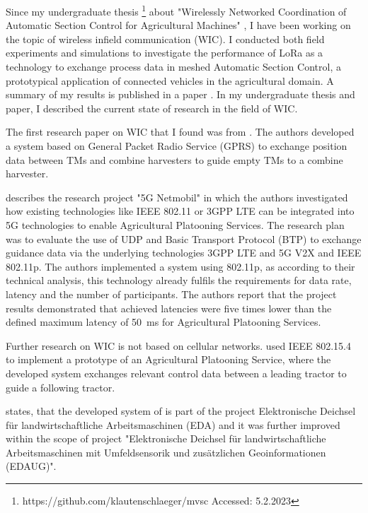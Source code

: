 Since my undergraduate thesis \footnote{https://github.com/klautenschlaeger/mvsc Accessed: 5.2.2023} about "Wirelessly Networked Coordination of Automatic Section Control for Agricultural Machines"
, I have been working on the topic of wireless infield communication (WIC). I conducted both field experiments and
simulations to investigate the performance of LoRa as a technology to exchange process data in
meshed Automatic Section Control, a prototypical application of connected vehicles in the agricultural domain.
A summary of my results is published in a paper \cite{lautenschlaeger_beyond_2022}.
In my undergraduate thesis and paper, I described the current state of research in the field of WIC.

The first research paper on WIC that I found was from \textcite{ali_multi-agent_2010}. The authors
developed a system based on General Packet Radio Service (GPRS) to exchange position data between \ac{TM}s and combine
harvesters to guide empty \ac{TM}s to a combine harvester.

\textcite{smolnik_5g_2020} describes the research project "5G Netmobil" in which the authors investigated how existing technologies like
IEEE 802.11 or 3GPP LTE can be integrated into 5G technologies to enable Agricultural Platooning Services. The research plan was to evaluate the use of \ac{UDP} and Basic Transport Protocol (BTP) to exchange guidance data via
the underlying technologies 3GPP LTE and 5G V2X and IEEE 802.11p. The authors implemented a system using 802.11p,
as according to their technical analysis, this technology already fulfils the requirements for data rate, latency
and the number of participants. The authors report that the project results demonstrated that achieved
latencies were five times lower than the defined maximum latency of \SI{50}{\milli\second} for Agricultural Platooning Services.

Further research on \ac{WIC} is not based on cellular networks. \cite{zhang_method_2009} used IEEE 802.15.4 to implement a
prototype of an Agricultural Platooning Service, where the developed system exchanges relevant control data between a leading tractor
to guide a following tractor.

\textcite{smolnik_5g_2020} states, that the developed system of \textcite{zhang_method_2009} is part
of the project Elektronische Deichsel für landwirtschaftliche Arbeitsmaschinen (EDA) 
and it was further improved within the scope of project "Elektronische Deichsel für landwirtschaftliche Arbeitsmaschinen mit Umfeldsensorik und zusätzlichen Geoinformationen (EDAUG)".


